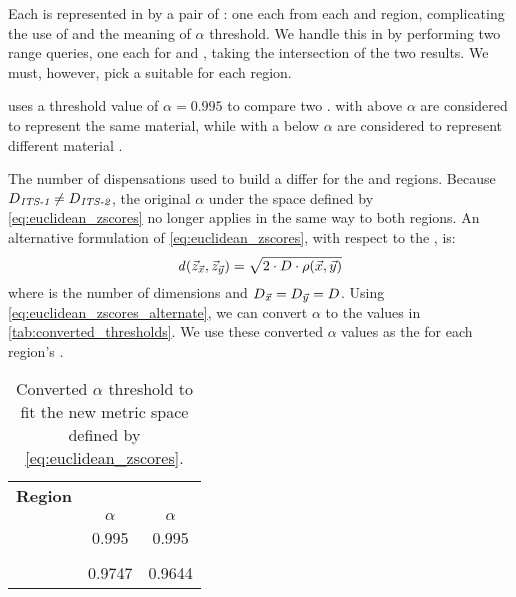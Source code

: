 Each \isol{} is represented in \cplop{} by a pair of \pyros{}: one each from each \Ssixt{} and \Sfive{} region, complicating the use of \dbscan{} and the meaning of $\alpha$ threshold.
We handle this in \dbscan{} by performing two range queries, one each for \Ssixt{} and \Sfive{}, taking the intersection of the two results.
We must, however, pick a suitable \eps{} for each \itsshort{} region.

\cplop{} uses a threshold value of $\alpha = 0.995$  to compare two \pyros{}.
\Pyros{} with \pearson{} above $\alpha$ are considered to represent the same \dna{} material, while \pyros{} with a \pearson{} below $\alpha$ are considered to represent different \dna{} material \cite{Shealy:SeniorProject, soliman2013cplop, SolimanDVMBNWKG12}.

The number of dispensations \numdims{} used to build a \pyro{} differ for the \Ssixt{} and \Sfive{} regions.
Because  $D{}_{\textit{\textit{ITS}{}-1}{}} \neq D{}_{\textit{\textit{ITS}{}-2}{}}$, the original $\alpha$ under the space defined by \eqref{eq:euclidean_zscores} no longer applies in the same way to both regions.
An alternative formulation of \eqref{eq:euclidean_zscores}, with respect to the \pearson{} \pcfunclabel{}, is:
\begin{equation}\label{eq:euclidean_zscores_alternate}
 \mathit{d}{}(\vec{z}_{\vec{x}}, \vec{z}_{\vec{y}}) = \sqrt{ 2\cdot D{}\cdot\rho{}(\vec{x}, \vec{y}) } 
\end{equation}
where \numdims{} is the number of dimensions and $D{}_{\vec{x}{}} = D{}_{\vec{y}{}} = D{}$. 
Using \autoref{eq:euclidean_zscores_alternate}, we can convert $\alpha$ to the values in \autoref{tab:converted_thresholds}. 
We use these converted $\alpha$ values as the \eps{} for each \itsshort{} region's .
\begin{table}
\centering
\caption{Converted $\alpha$ threshold to fit the new metric space defined by \eqref{eq:euclidean_zscores}.}
\label{tab:converted_thresholds}
\begin{tabular}{|c|c|c|}
\hline
\textbf{\itsshort{} Region} & \Ssixt{}     & \Sfive{}     \\
                            & $\alpha$     & $\alpha$     \\ \hline
\pcfunc{\pca}{\pcb}         & 0.995        & 0.995        \\ \hline
\numdims{}                  & \Ssixtdims{} & \Sfivedims{} \\ \hline
\euczfunc{\pca{}}{\pcb{}}   & 0.9747       & 0.9644       \\ \hline
\end{tabular}
\end{table}

